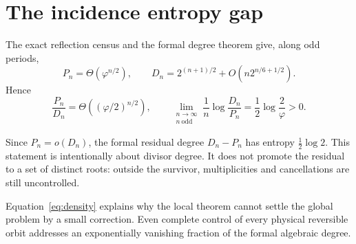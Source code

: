 \section{The incidence entropy gap}

The exact reflection census and the formal degree theorem give, along odd
periods,
\[
P_n=\Theta(\varphi^{n/2}),\qquad
D_n=2^{(n+1)/2}+O(n2^{n/6+1/2}).
\]
Hence
\begin{equation}\label{eq:density}
\frac{P_n}{D_n}=\Theta\!\left((\varphi/2)^{n/2}\right),
\qquad
\lim_{\substack{n\to\infty\\ n\ \mathrm{odd}}}
\frac1n\log\frac{D_n}{P_n}=\frac12\log\frac2\varphi>0.
\end{equation}

Since $P_n=o(D_n)$, the formal residual degree $D_n-P_n$ has entropy
$\frac12\log2$.  This statement is intentionally about divisor degree.  It
does not promote the residual to a set of distinct roots: outside the
survivor, multiplicities and cancellations are still uncontrolled.

Equation~\eqref{eq:density} explains why the local theorem cannot settle the
global problem by a small correction.  Even complete control of every
physical reversible orbit addresses an exponentially vanishing fraction of
the formal algebraic degree.
